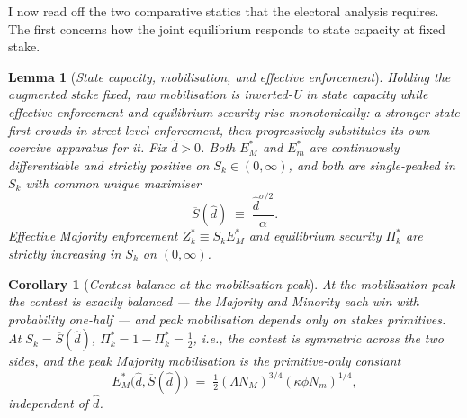 \documentclass[11pt,twoside]{extarticle}
\newtheorem{corollary}{Corollary}
\newtheorem{lemma}{Lemma}
\begin{document}
I now read off the two comparative statics that the electoral analysis requires. The first concerns how the joint equilibrium responds to state capacity at fixed stake.

\begin{lemma}[\emph{State capacity, mobilisation, and effective enforcement}]\label{lem:Sk_v2}\label{lem:Sk_statics}
\emph{Holding the augmented stake fixed, raw mobilisation is inverted-U in state capacity while effective enforcement and equilibrium security rise monotonically: a stronger state first crowds in street-level enforcement, then progressively substitutes its own coercive apparatus for it.}
Fix $\hat d>0$. Both $E_M^*$ and $E_m^*$ are continuously differentiable and strictly positive on $S_k\in(0,\infty)$, and both are single-peaked in $S_k$ with common unique maximiser
\begin{equation}\label{eq:Sk_threshold}
    \overline S(\hat d)\;\equiv\;\frac{\hat d^{\sigma/2}}{\alpha}.
\end{equation}
Effective Majority enforcement $Z_k^*\equiv S_k E_M^*$ and equilibrium security $\Pi_k^*$ are strictly increasing in $S_k$ on $(0,\infty)$.
\end{lemma}

\begin{corollary}[\emph{Contest balance at the mobilisation peak}]\label{cor:peak_v2}\label{cor:Sk_threshold}
\emph{At the mobilisation peak the contest is exactly balanced --- the Majority and Minority each win with probability one-half --- and peak mobilisation depends only on stakes primitives.}
At $S_k=\overline S(\hat d)$, $\Pi_k^*=1-\Pi_k^*=\tfrac{1}{2}$, i.e., the contest is symmetric across the two sides, and the peak Majority mobilisation is the primitive-only constant
\begin{equation}\label{eq:EM_peak_v2}
    E_M^*\big(\hat d,\overline S(\hat d)\big)\;=\;\tfrac{1}{2}(\Lambda N_M)^{3/4}(\kappa\phi N_m)^{1/4},
\end{equation}
independent of $\hat d$.
\end{corollary}
\end{document}
